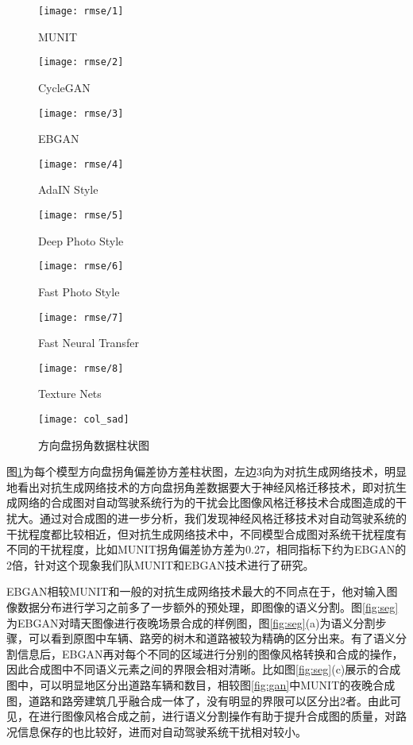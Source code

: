 \begin{figure}[!h]
    \texttt{[image: rmse/1]} 
    \caption{MUNIT}
\end{figure}
\begin{figure}[!h]
    \texttt{[image: rmse/2]} 
    \caption{CycleGAN}
\end{figure}
\begin{figure}[!h]
    \texttt{[image: rmse/3]} 
    \caption{EBGAN}
\end{figure}
\begin{figure}[!h]
    \texttt{[image: rmse/4]} 
    \caption{AdaIN Style}
\end{figure}
\begin{figure}[!h]
    \texttt{[image: rmse/5]} 
    \caption{Deep Photo Style}
\end{figure}
\begin{figure}[!h]
    \texttt{[image: rmse/6]} 
    \caption{Fast Photo Style}
\end{figure}
\begin{figure}[!h]
    \texttt{[image: rmse/7]} 
    \caption{Fast Neural Transfer}
\end{figure}
\begin{figure}[!h]
    \texttt{[image: rmse/8]} 
    \caption{Texture Nets}
\end{figure}

\begin{figure}[ht]
    \centering
    \texttt{[image: col\_sad]}
    \caption{方向盘拐角数据柱状图}
    \label{fig:col_sad}
\end{figure}

图\ref{fig:col_sad}为每个模型方向盘拐角偏差协方差柱状图，左边3向为对抗生成网络技术，明显地看出对抗生成网络技术的方向盘拐角差数据要大于神经风格迁移技术，即对抗生成网络的合成图对自动驾驶系统行为的干扰会比图像风格迁移技术合成图造成的干扰大。通过对合成图的进一步分析，我们发现神经风格迁移技术对自动驾驶系统的干扰程度都比较相近，但对抗生成网络技术中，不同模型合成图对系统干扰程度有不同的干扰程度，比如MUNIT拐角偏差协方差为0.27，相同指标下约为EBGAN的2倍，针对这个现象我们队MUNIT和EBGAN技术进行了研究。

EBGAN相较MUNIT和一般的对抗生成网络技术最大的不同点在于，他对输入图像数据分布进行学习之前多了一步额外的预处理，即图像的语义分割。图\ref{fig:seg}为EBGAN对晴天图像进行夜晚场景合成的样例图，图\ref{fig:seg}(a)为语义分割步骤，可以看到原图中车辆、路旁的树木和道路被较为精确的区分出来。有了语义分割信息后，EBGAN再对每个不同的区域进行分别的图像风格转换和合成的操作，因此合成图中不同语义元素之间的界限会相对清晰。比如图\ref{fig:seg}(c)展示的合成图中，可以明显地区分出道路车辆和数目，相较图\ref{fig:gan}中MUNIT的夜晚合成图，道路和路旁建筑几乎融合成一体了，没有明显的界限可以区分出2者。由此可见，在进行图像风格合成之前，进行语义分割操作有助于提升合成图的质量，对路况信息保存的也比较好，进而对自动驾驶系统干扰相对较小。

